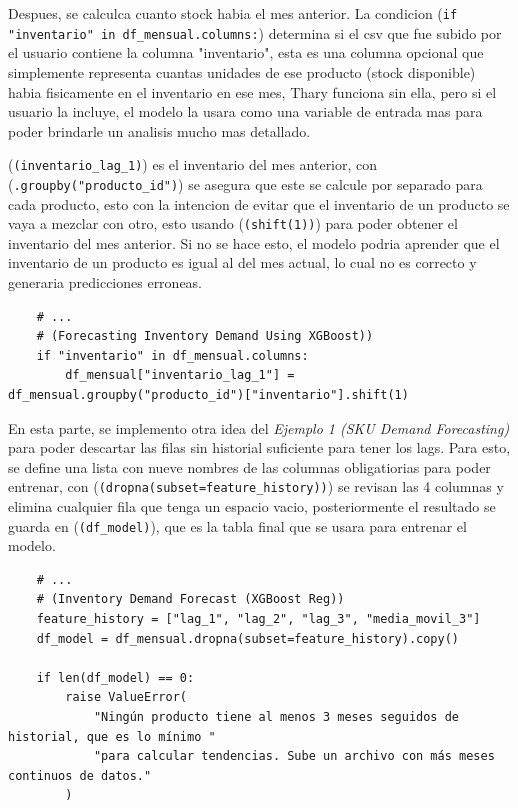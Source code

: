 Despues, se calculca cuanto stock habia el mes anterior. La condicion (\texttt{if "inventario" in df\_mensual.columns:}) determina si el csv que fue subido por el usuario contiene la columna "inventario", esta es una columna opcional que simplemente representa cuantas unidades de ese producto (stock disponible) habia fisicamente en el inventario en ese mes, Thary funciona sin ella, pero si el usuario la incluye, el modelo la usara como una variable de entrada mas para poder brindarle un analisis mucho mas detallado. 

(\texttt{(inventario\_lag\_1)}) es el inventario del mes anterior, con (\texttt{.groupby("producto\_id")}) se asegura que este se calcule por separado para cada producto, esto con la intencion de evitar que el inventario de un producto se vaya a mezclar con otro, esto usando (\texttt{(shift(1))}) para poder obtener el inventario del mes anterior. Si no se hace esto, el modelo podria aprender que el inventario de un producto es igual al del mes actual, lo cual no es correcto y generaria predicciones erroneas. 

\begin{verbatim}
    # ...
    # (Forecasting Inventory Demand Using XGBoost))
    if "inventario" in df_mensual.columns:
        df_mensual["inventario_lag_1"] = df_mensual.groupby("producto_id")["inventario"].shift(1)
\end{verbatim}

En esta parte, se implemento otra idea del \textit{Ejemplo 1 (SKU Demand Forecasting)} \cite{ejemplo1_demandforecast} para poder descartar las filas sin historial suficiente para tener los lags. Para esto, se define una lista con nueve nombres de las columnas obligatiorias para poder entrenar, con (\texttt{(dropna(subset=feature\_history))}) se revisan las 4 columnas y elimina cualquier fila que tenga un espacio vacio, posteriormente el resultado se guarda en (\texttt{(df\_model)}), que es la tabla final que se usara para entrenar el modelo.

\begin{verbatim}
    # ...
    # (Inventory Demand Forecast (XGBoost Reg))
    feature_history = ["lag_1", "lag_2", "lag_3", "media_movil_3"]
    df_model = df_mensual.dropna(subset=feature_history).copy()

    if len(df_model) == 0:
        raise ValueError(
            "Ningún producto tiene al menos 3 meses seguidos de historial, que es lo mínimo "
            "para calcular tendencias. Sube un archivo con más meses continuos de datos."
        )
\end{verbatim}

